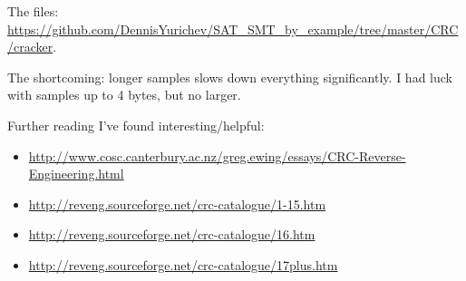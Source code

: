 The files: \url{https://github.com/DennisYurichev/SAT_SMT_by_example/tree/master/CRC/cracker}.

The shortcoming: longer samples slows down everything significantly.
I had luck with samples up to 4 bytes, but no larger.

Further reading I've found interesting/helpful:

\begin{itemize}

\item \url{http://www.cosc.canterbury.ac.nz/greg.ewing/essays/CRC-Reverse-Engineering.html}
\item \url{http://reveng.sourceforge.net/crc-catalogue/1-15.htm}
\item \url{http://reveng.sourceforge.net/crc-catalogue/16.htm}
\item \url{http://reveng.sourceforge.net/crc-catalogue/17plus.htm}

\end{itemize}

